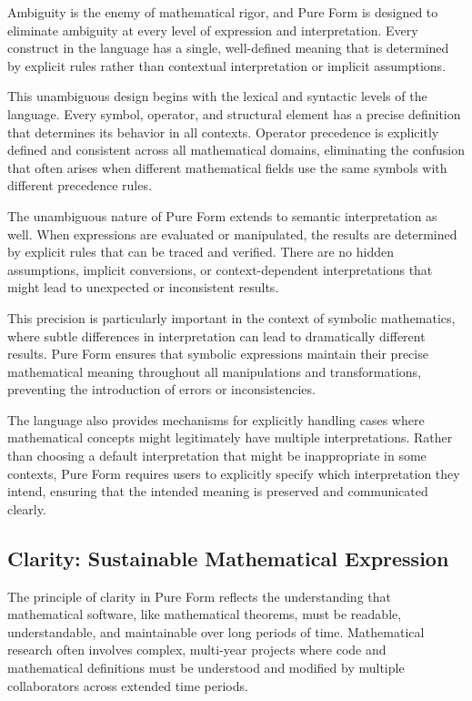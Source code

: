 Ambiguity is the enemy of mathematical rigor, and Pure Form is designed to eliminate ambiguity at every level of expression and interpretation.
Every construct in the language has a single, well-defined meaning that is determined by explicit rules rather than contextual interpretation or implicit assumptions.

This unambiguous design begins with the lexical and syntactic levels of the language.
Every symbol, operator, and structural element has a precise definition that determines its behavior in all contexts.
Operator precedence is explicitly defined and consistent across all mathematical domains, eliminating the confusion that often arises when different mathematical fields use the same symbols with different precedence rules.

The unambiguous nature of Pure Form extends to semantic interpretation as well.
When expressions are evaluated or manipulated, the results are determined by explicit rules that can be traced and verified.
There are no hidden assumptions, implicit conversions, or context-dependent interpretations that might lead to unexpected or inconsistent results.

This precision is particularly important in the context of symbolic mathematics, where subtle differences in interpretation can lead to dramatically different results.
Pure Form ensures that symbolic expressions maintain their precise mathematical meaning throughout all manipulations and transformations, preventing the introduction of errors or inconsistencies.

The language also provides mechanisms for explicitly handling cases where mathematical concepts might legitimately have multiple interpretations.
Rather than choosing a default interpretation that might be inappropriate in some contexts, Pure Form requires users to explicitly specify which interpretation they intend, ensuring that the intended meaning is preserved and communicated clearly.

\subsection{Clarity: Sustainable Mathematical Expression}

The principle of clarity in Pure Form reflects the understanding that mathematical software, like mathematical theorems, must be readable, understandable, and maintainable over long periods of time.
Mathematical research often involves complex, multi-year projects where code and mathematical definitions must be understood and modified by multiple collaborators across extended time periods.

